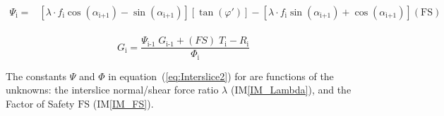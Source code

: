 \documentclass[12pt]{article}
\newcommand{\iref}[1]{IM\ref{#1}}
\begin{document}
~\newline 
\begin{equation}\label{eq:Psi}\begin{aligned}
\Psi_{\text{i}} ={}& \left[ \lambda \cdot f_{\text{i}}
  \cos\left(\alpha_{\text{i+1}}\right) -
  \sin\left(\alpha_{\text{i+1}}\right) \right]\left[
  \tan\left(\varphi'\right) \right] - \left[ \lambda \cdot
  f_{\text{i}} \sin\left(\alpha_{\text{i+1}}\right) +
  \cos\left(\alpha_{\text{i+1}}\right) \right] \left( \text{FS}
\right)
 \end{aligned}\end{equation}
~\newline
\begin{equation}\label{eq:Interslice2}
{G}_{\text{i}} = \frac{{\Psi_{\text{i-1}}}\;{{G}_{\text{i-1}}} +
  \left({{FS}}\right)\;{T_{\text{i}}} -
       {R_{\text{i}}}}{\Phi_{\text{i}}}
\end{equation}

\noindent
The constants $\Psi$ and $\Phi$ in equation~(\ref{eq:Interslice2}) for
are functions of the unknowns: the interslice normal/shear force ratio $\lambda{}$  (\iref{IM_Lambda}), and the Factor
of Safety $\text{FS}$ (\iref{IM_FS}).

~\newline

\end{document}
